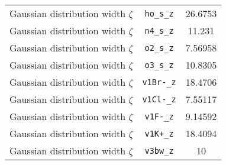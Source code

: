 \begin{table}[ht]
\begin{tabular}{|c|c|c|}
Gaussian distribution width $\zeta$ & \verb^ho_s_z^ & 26.6753 \\ 
Gaussian distribution width $\zeta$ & \verb^n4_s_z^ & 11.231 \\ 
Gaussian distribution width $\zeta$ & \verb^o2_s_z^ & 7.56958 \\ 
Gaussian distribution width $\zeta$ & \verb^o3_s_z^ & 10.8305 \\ 
Gaussian distribution width $\zeta$ & \verb^v1Br-_z^ & 18.4706 \\ 
Gaussian distribution width $\zeta$ & \verb^v1Cl-_z^ & 7.55117 \\ 
Gaussian distribution width $\zeta$ & \verb^v1F-_z^ & 9.14592 \\ 
Gaussian distribution width $\zeta$ & \verb^v1K+_z^ & 18.4094 \\ 
Gaussian distribution width $\zeta$ & \verb^v3bw_z^ & 10 \\ 
\hline
\end{tabular}
\end{table}
